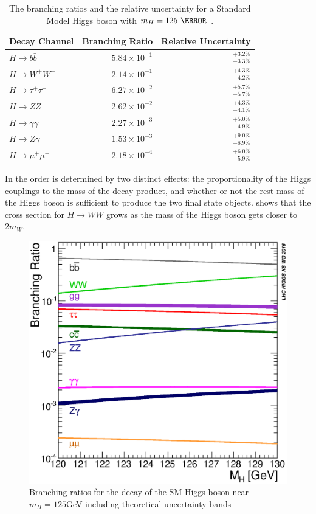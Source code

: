 \begin{table}[htpb]
 \centering
 \caption{ The branching ratios and the relative uncertainty for a Standard Model Higgs boson with $m_{H}=125~\GeV$ \cite{PDG2018:Ch11}.}
 \begin{tabular}{@{}lrr@{}} \toprule
  Decay Channel           & Branching Ratio       & Relative Uncertainty \\ \midrule
  $H\to b\bar{b}$         & $5.84 \times 10^{-1}$ & $_{-3.3\%}^{+3.2\%}$ \\
  \addlinespace[0.3em]
  $H\to W^{+}W^{-}$       & $2.14 \times 10^{-1}$ & $_{-4.2\%}^{+4.3\%}$ \\
  \addlinespace[0.3em]
  $H\to \tau^{+}\tau^{-}$ & $6.27 \times 10^{-2}$ & $_{-5.7\%}^{+5.7\%}$ \\
  \addlinespace[0.3em]
  $H\to ZZ$               & $2.62 \times 10^{-2}$ & $_{-4.1\%}^{+4.3\%}$ \\
  \addlinespace[0.3em]
  $H\to \gamma\gamma$     & $2.27 \times 10^{-3}$ & $_{-4.9\%}^{+5.0\%}$ \\
  \addlinespace[0.3em]
  $H\to Z\gamma$          & $1.53 \times 10^{-3}$ & $_{-8.9\%}^{+9.0\%}$ \\
  \addlinespace[0.3em]
  $H\to \mu^{+}\mu^{-}$   & $2.18 \times 10^{-4}$ & $_{-5.9\%}^{+6.0\%}$ \\
  \bottomrule
 \end{tabular}\label{table:higgs_branching_ratios}
\end{table} 

In  the order is determined by two distinct
effects: the proportionality of the Higgs couplings to the mass of the decay
product, and whether or not the rest mass of the Higgs boson is sufficient to
produce the two final state objects.   shows that
the cross section for $H \rightarrow WW$ grows as the mass of the Higgs boson
gets closer to $2m_W$.

\begin{figure}[!htbp]
  \begin{center}
    \includegraphics[width=0.5\linewidth]{figures/higgs/higgs_decay_plot.eps}
    \caption{Branching ratios for the decay of the SM Higgs boson near $m_{H} = 125$GeV including theoretical uncertainty bands \cite{PDG2018:Ch11}}
    \label{fig:higgs_decay_plot}
  \end{center}
\end{figure}


